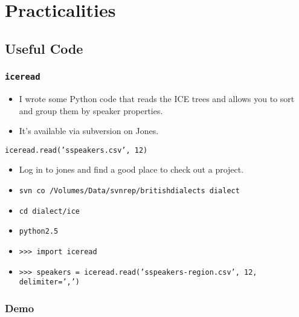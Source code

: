 \documentclass{beamer}
\begin{document}
\section{Practicalities}
\subsection{Useful Code}
\begin{frame}
  \frametitle{\tt iceread}
  \begin{itemize}
  \item I wrote some Python code that reads the ICE trees and allows you
    to sort and group them by speaker properties.
  \item It's available via subversion on Jones.
  \end{itemize}
\end{frame}
\begin{frame}
\begin{example}
    {\tt iceread.read('sspeakers.csv', 12)}
\end{example}
  \begin{itemize}
    \item Log in to jones and find a good place to check out a
      project.
  \item {\tt svn co /Volumes/Data/svnrep/britishdialects dialect}
    \item {\tt cd dialect/ice}
    \item {\tt python2.5} %
    \item {\tt >>> import iceread}
    \item {\tt >>> speakers = iceread.read('sspeakers-region.csv', 12,
        delimiter=',')}
  \end{itemize} %
\end{frame}
\begin{frame}
  \frametitle{Demo}
\end{frame}
\end{document}
